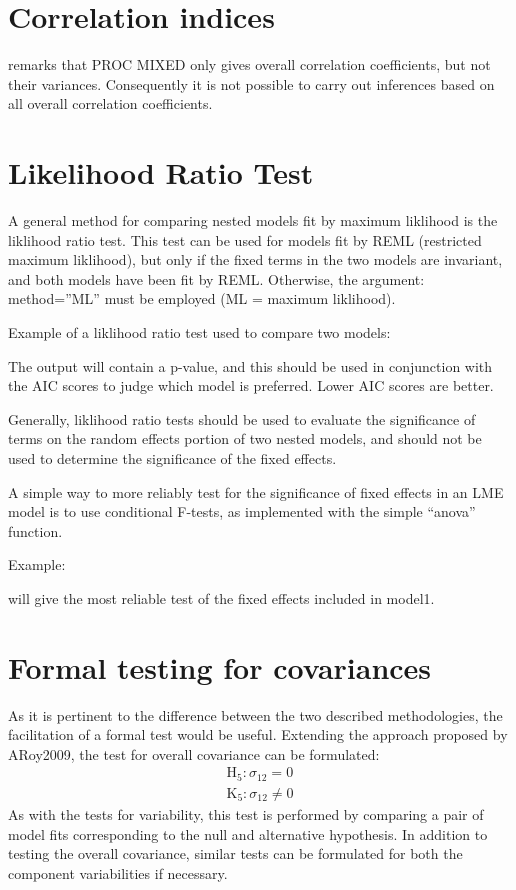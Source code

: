 \documentclass[12pt, a4paper]{report}
\theoremstyle{plain}
\theoremstyle{definition}
\theoremstyle{remark}
\begin{document}
	\section{Correlation indices}
	\citet{ARoy2009} remarks that PROC MIXED only gives overall correlation coefficients, but not their variances. Consequently it is not possible to carry out inferences based on all overall correlation coefficients.
	
	\section{Likelihood Ratio Test}
	A general method for comparing nested models fit by maximum liklihood is the liklihood ratio 
	test. This test can be used for models fit by REML (restricted maximum liklihood), but only if the 
	fixed terms in the two models are invariant, and both models have been fit by REML. Otherwise, 
	the argument: method=”ML” must be employed (ML = maximum liklihood). 
	
	Example of a liklihood ratio test used to compare two models: 
	
	
	
	The output will contain a p-value, and this should be used in conjunction with the AIC scores to 
	judge which model is preferred. Lower AIC scores are better. 
	
	Generally, liklihood ratio tests should be used to evaluate the significance of terms on the 
	random effects portion of two nested models, and should not be used to determine the 
	significance of the fixed effects. 
	
	A simple way to more reliably test for the significance of fixed effects in an LME model is to use 
	conditional F-tests, as implemented with the simple “anova” function. 
	
	Example: 
	
	will give the most reliable test of the fixed effects included in model1. 
	
	
	
	
	
	
	
	\section{Formal testing for covariances }
	As it is pertinent to the difference between the two described methodologies, the facilitation of a formal test would be useful. Extending the approach proposed by ARoy2009, the test for overall covariance can be formulated:
	\begin{eqnarray*}
		\operatorname{H_5} : \sigma_{12} = 0 \\
		\operatorname{K_5} : \sigma_{12} \neq 0
	\end{eqnarray*}
	As with the tests for variability, this test is performed by comparing a pair of model fits corresponding to the null and alternative hypothesis. In addition to testing the overall covariance, similar tests can be formulated for both the component variabilities if necessary.
	
\end{document}
